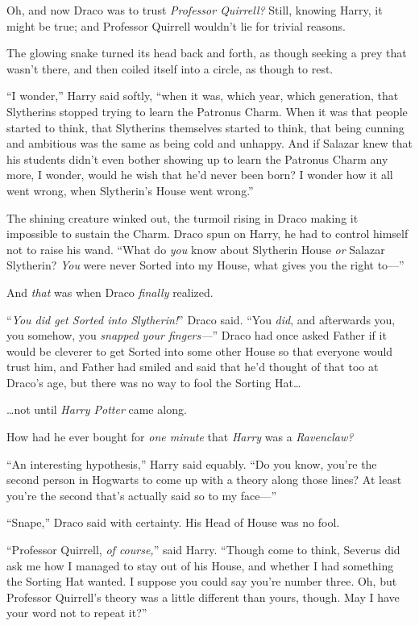 Oh, and now Draco was to trust \emph{Professor Quirrell?} Still, knowing Harry, it might be true; and Professor Quirrell wouldn’t lie for trivial reasons.

The glowing snake turned its head back and forth, as though seeking a prey that wasn’t there, and then coiled itself into a circle, as though to rest.

“I wonder,” Harry said softly, “when it was, which year, which generation, that Slytherins stopped trying to learn the Patronus Charm. When it was that people started to think, that Slytherins themselves started to think, that being cunning and ambitious was the same as being cold and unhappy. And if Salazar knew that his students didn’t even bother showing up to learn the Patronus Charm any more, I wonder, would he wish that he’d never been born? I wonder how it all went wrong, when Slytherin’s House went wrong.”

The shining creature winked out, the turmoil rising in Draco making it impossible to sustain the Charm. Draco spun on Harry, he had to control himself not to raise his wand. “What do \emph{you} know about Slytherin House \emph{or} Salazar Slytherin? \emph{You} were never Sorted into my House, what gives you the right to—”

And \emph{that} was when Draco \emph{finally} realized.

“\emph{You did get Sorted into Slytherin!}” Draco said. “You \emph{did}, and afterwards you, you somehow, you \emph{snapped your fingers—}” Draco had once asked Father if it would be cleverer to get Sorted into some other House so that everyone would trust him, and Father had smiled and said that he’d thought of that too at Draco’s age, but there was no way to fool the Sorting Hat…

…not until \emph{Harry Potter} came along.

How had he ever bought for \emph{one minute} that \emph{Harry} was a \emph{Ravenclaw?}

“An interesting hypothesis,” Harry said equably. “Do you know, you’re the second person in Hogwarts to come up with a theory along those lines? At least you’re the second that’s actually said so to my face—”

“Snape,” Draco said with certainty. His Head of House was no fool.

“Professor Quirrell, \emph{of course,}” said Harry. “Though come to think, Severus did ask me how I managed to stay out of his House, and whether I had something the Sorting Hat wanted. I suppose you could say you’re number three. Oh, but Professor Quirrell’s theory was a little different than yours, though. May I have your word not to repeat it?”

